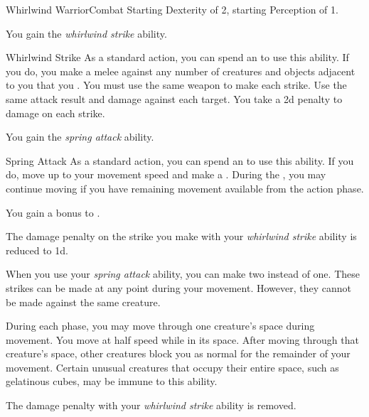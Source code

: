     \begin{feat}{Whirlwind Warrior}{Combat}
        \featpres Starting Dexterity of 2, starting Perception of 1.

         You gain the \textit{whirlwind strike} ability.
        \begin{ability}{Whirlwind Strike}
            As a standard action, you can spend an  to use this ability.
            If you do, you make a melee  against any number of creatures and objects adjacent to you that you .
            You must use the same weapon to make each strike.
            Use the same attack result and damage against each target.
            You take a \minus2d penalty to damage on each strike.
        \end{ability}

         You gain the \textit{spring attack} ability.
        \begin{ability}{Spring Attack}
            As a standard action, you can spend an  to use this ability.
            If you do, move up to your movement speed and make a .
            During the , you may continue moving if you have remaining movement available from the action phase.
        \end{ability}

         You gain a  bonus to .

         The damage penalty on the strike you make with your \textit{whirlwind strike} ability is reduced to \minus1d.

         When you use your \textit{spring attack} ability, you can make two  instead of one.
        These strikes can be made at any point during your movement.
        However, they cannot be made against the same creature.

         During each phase, you may move through one creature's space during movement.
        You move at half speed while in its space.
        After moving through that creature's space, other creatures block you as normal for the remainder of your movement.
        Certain unusual creatures that occupy their entire space, such as gelatinous cubes, may be immune to this ability.

         The damage penalty with your \textit{whirlwind strike} ability is removed.


\end{feat}
